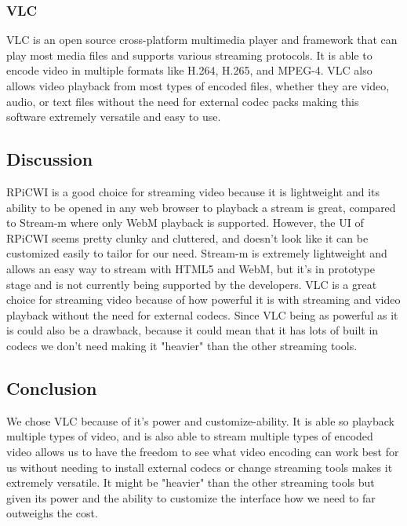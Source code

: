 \documentclass[onecolumn, draftclsnofoot,10pt, compsoc]{IEEEtran}
\begin{document}
\subsubsection{VLC}
VLC is an open source cross-platform multimedia player and framework that can play most media files and supports various streaming protocols. It is able to encode video in multiple formats like H.264, H.265, and MPEG-4. VLC also allows video playback from most types of encoded files, whether they are video, audio, or text files without the need for external codec packs making this software extremely versatile and easy to use.




\subsection{Discussion}
RPiCWI is a good choice for streaming video because it is lightweight and its ability to be opened in any web browser to playback a stream is great, compared to Stream-m where only WebM playback is supported. However, the UI of RPiCWI seems pretty clunky and cluttered, and doesn't look like it can be customized easily to tailor for our need. Stream-m is extremely lightweight and allows an easy way to stream with HTML5 and WebM, but it's in prototype stage and is not currently being supported by the developers. VLC is a great choice for streaming video because of how powerful it is with streaming and video playback without the need for external codecs. Since VLC being as powerful as it is could also be a drawback, because it could mean that it has lots of built in codecs we don't need making it "heavier" than the other streaming tools.




\subsection{Conclusion}
We chose VLC because of it's power and customize-ability. It is able so playback multiple types of video, and is also able to stream multiple types of encoded video allows  us to have the freedom to see what video encoding can work best for us without needing to install external codecs or change streaming tools makes it extremely versatile. It might be "heavier" than the other streaming tools but given its power and the ability to customize the interface how we need to far outweighs the cost.
\end{document}
